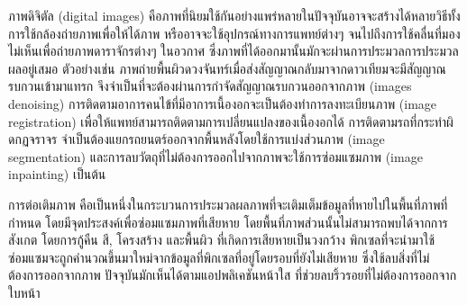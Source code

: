 \documentclass[hidelinks,a4paper,14pt]{article}
\numberwithin{equation}{section}							%
\begin{document}
{%
	
	
	
	
	
	ภาพดิจิตัล (digital images)  คือภาพที่นิยมใช้กันอย่างแพร่หลายในปัจจุบันอาจจะสร้างได้หลายวิธีทั้งการใช้กล้องถ่ายภาพเพื่อให้ได้ภาพ หรืออาจจะใช้อุปกรณ์ทางการแพทย์ต่างๆ จนไปถึงการใช้คลื่นที่มองไม่เห็นเพื่อถ่ายภาพดาราจักรต่างๆ ในอวกาศ  ซึ่งภาพที่ได้ออกมานั้นมักจะผ่านการประมวลการประมวลผลอยู่เสมอ ตัวอย่างเช่น ภาพถ่ายพื้นผิวดวงจันทร์เมื่อส่งสัญญาณกลับมาจากดาวเทียมจะมีสัญญาณรบกวนเข้ามาแทรก จึงจำเป็นที่จะต้องผ่านการกำจัดสัญญาณรบกวนออกจากภาพ (images denoising) การติดตามอาการคนไข้ที่มีอาการเนื้องอกจะเป็นต้องทำการลงทะเบียนภาพ (image registration) เพื่อให้แพทย์สามารถติดตามการเปลี่ยนแปลงของเนื้องอกได้ การติดตามรถที่กระทำผิดกฏจราจร จำเป็นต้องแยกรถยนตร์ออกจากพื้นหลังโดยใช้การแบ่งส่วนภาพ (image segmentation) และการลบวัตถุที่ไม่ต้องการออกไปจากภาพจะใช้การซ่อมแซมภาพ (image inpainting) เป็นต้น 
	
	
	การต่อเติมภาพ คือเป็นหนึ่งในกระบวนการประมวลผลภาพที่จะเติมเต็มข้อมูลที่หายไปในพื้นที่ภาพที่กำหนด โดยมีจุดประสงค์เพื่อซ่อมแซมภาพที่เสียหาย โดยพื้นที่ภาพส่วนนั้นไม่สามารถพบได้จากการสังเกต โดยการกู้คืน สี, โครงสร้าง และพื้นผิว ที่เกิดการเสียหายเป็นวงกว้าง พิกเซลที่จะนำมาใช้ซ่อมแซมจะถูกคำนวณขึ้นมาใหม่จากข้อมูลที่พิกเซลที่อยู่โดยรอบที่ยังไม่เสียหาย \cite{ref:defination-of-inpaint}  ซึ่งใช้ลบสิ่งที่ไม่ต้องการออกจากภาพ ปัจจุบันมักเห็นได้ตามแอปพลิเคชันหน้าใส ที่ช่วยลบริ้วรอยที่ไม่ต้องการออกจากใบหน้า
	
		
}
\end{document}
